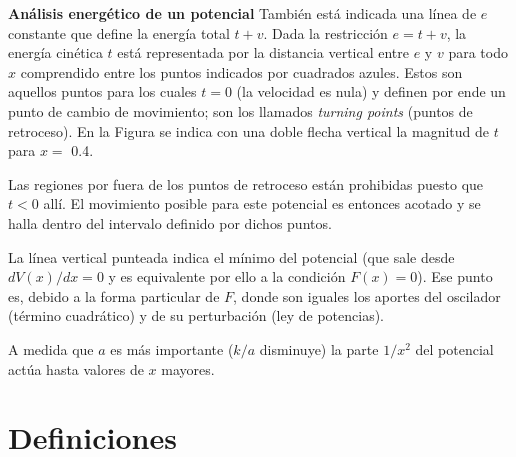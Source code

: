 \documentclass[10pt,oneside]{CBFT_book}
\begin{document}
\begin{ejemplo}{\bfseries Análisis energético de un potencial }
También está indicada una línea de $ e $ constante que define la energía total $t + v$. Dada la restricción $ e = t + 
v$, la energía cinética $t$ está representada por la distancia vertical entre $e$ y $v$ para todo $x$ comprendido entre 
los puntos indicados por cuadrados azules. Estos son aquellos puntos para los cuales $t=0$ (la velocidad es nula) y 
definen por ende un punto de cambio de movimiento; son los llamados {\it turning points} (puntos de retroceso). 
En la Figura se indica con una doble flecha vertical la magnitud de $t$ para $x =$ 0.4.

Las regiones por fuera de los puntos de retroceso están prohibidas puesto que $ t < 0 $ allí.
El movimiento posible para este potencial es entonces acotado y se halla dentro del intervalo definido por dichos 
puntos.

La línea vertical punteada indica el mínimo del potencial (que sale desde $ dV(x)/dx = 0 $ y es equivalente por ello a 
la condición $ F(x)= 0 $). Ese punto es, debido a la forma particular de $F$, donde son iguales los aportes del 
oscilador (término cuadrático) y de su perturbación (ley de potencias).

A medida que $ a $ es más importante ($k/a$ disminuye) la parte $ 1 / x^2 $ del potencial actúa hasta valores de $ x $ 
mayores.

\end{ejemplo}




\section{Definiciones}
\end{document}
